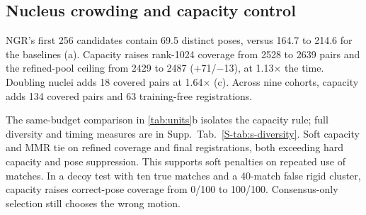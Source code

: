 \subsection{Nucleus crowding and capacity control}
\label{sec:crowding}

NGR's first 256 candidates contain 69.5 distinct poses, versus 164.7 to 214.6 for the baselines (a). Capacity raises rank-1024 coverage from 2528 to 2639 pairs and the refined-pool ceiling from 2429 to 2487 (+71/$-$13), at 1.13$\times$ the time. Doubling nuclei adds 18 covered pairs at 1.64$\times$ (c). Across nine cohorts, capacity adds 134 covered pairs and 63 training-free registrations.

The same-budget comparison in \cref{tab:units}b isolates the capacity rule; full diversity and timing measures are in Supp.~Tab.~\ref*{S-tab:s-diversity}. Soft capacity and MMR tie on refined coverage and final registrations, both exceeding hard capacity and pose suppression. This supports soft penalties on repeated use of matches. In a decoy test with ten true matches and a 40-match false rigid cluster, capacity raises correct-pose coverage from 0/100 to 100/100. Consensus-only selection still chooses the wrong motion.
